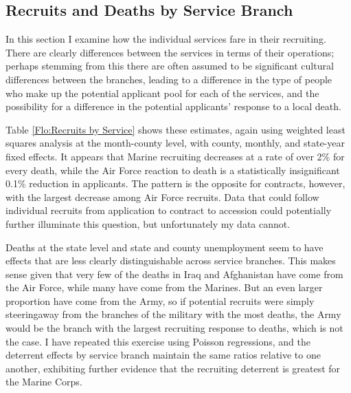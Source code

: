 \documentclass[12pt] {article}
\begin{document}
\begin{table}
\caption{}
\label{Flo:paygrade}
\scalebox{0.8}{
}
\end{table}
  
\subsection{Recruits and Deaths by Service Branch}\label{sec:servicebranch}
In this section I examine how the individual services fare in their recruiting. There are clearly differences between the services in terms of their operations; perhaps stemming from this there are often assumed to be significant cultural differences between the branches, leading to a difference in the type of people who make up the potential applicant pool for each of the services, and the possibility for a difference in the potential applicants' response to a local death.

Table \ref{Flo:Recruits by Service} shows these estimates, again using weighted least squares analysis at the month-county level, with county, monthly, and state-year fixed effects. It appears that Marine recruiting decreases at a rate of over 2\% for every death, while the Air Force reaction to death is a statistically insignificant 0.1\% reduction in applicants. The pattern is the opposite for contracts, however, with the largest decrease among Air Force recruits. Data that could follow individual recruits from application to contract to accession could potentially further illuminate this question, but unfortunately my data cannot. 

Deaths at the state level and state and county unemployment seem to have effects that are less clearly distinguishable across service branches. This makes sense given that very few of the deaths in Iraq and Afghanistan have come from the Air Force, while many have come from the Marines. But an even larger proportion have come from the Army, so if potential recruits were simply steeringaway from the branches of the military with the most deaths, the Army would be the branch with the largest recruiting response to deaths, which is not the case. I have repeated this exercise using Poisson regressions, and the deterrent effects by service branch maintain the same ratios relative to one another, exhibiting further evidence that the recruiting deterrent is greatest for the Marine Corps. 
\end{document}
